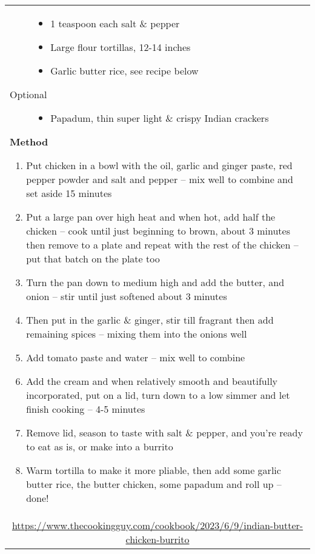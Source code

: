 \documentclass[web-recipes.tex]{subfiles}
\begin{document}
\begin{mdframed}[nobreak]
\begin{tabular}{l}
\begin{minipage}[t]{0.35\textwidth}
\begin{description}
\begin{itemize}
          \item 1 teaspoon each salt \& pepper
          \item Large flour tortillas, 12-14 inches
          \item Garlic butter rice, see recipe below
        \end{itemize}
      \item[Optional]\hfill
        \begin{itemize}\raggedright\small\sffamily
          \item Papadum, thin super light \& crispy Indian crackers
        \end{itemize}
    \end{description}
  \end{minipage}
  \qquad
  \begin{minipage}[t]{0.55\textwidth}
    {\sffamily\bfseries Method}\vspace{0.5ex}
    \begin{enumerate}\raggedright\small\sffamily
      \item Put chicken in a bowl with the oil, garlic and ginger paste,
        red pepper powder and salt and pepper – mix well to combine and set
        aside 15 minutes
      \item Put a large pan over high heat and when hot, add half the
        chicken – cook until just beginning to brown, about 3 minutes then
        remove to a plate and repeat with the rest of the chicken – put
        that batch on the plate too
      \item Turn the pan down to medium high and add the butter, and
        onion – stir until just softened about 3 minutes
      \item Then put in the garlic \& ginger, stir till fragrant then add
        remaining spices – mixing them into the onions well
      \item Add tomato paste and water – mix well to combine
      \item Add the cream and when relatively smooth and beautifully
        incorporated, put on a lid, turn down to a low simmer and let
        finish cooking – 4-5 minutes
      \item Remove lid, season to taste with salt \& pepper, and you’re
        ready to eat as is, or make into a burrito
      \item Warm tortilla to make it more pliable, then add some garlic
        butter rice, the butter chicken, some papadum and roll up – done!
    \end{enumerate}
  \end{minipage} \vspace{3ex}\\
  \multicolumn{1}{c}{\small\ttfamily
  \url{https://www.thecookingguy.com/cookbook/2023/6/9/indian-butter-chicken-burrito}} \\
\end{tabular}
\end{mdframed}
\end{document}

